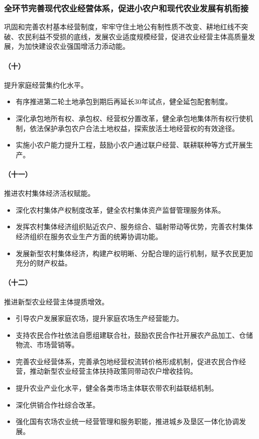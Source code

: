\subsubsection{全环节完善现代农业经营体系，促进小农户和现代农业发展有机衔接}

巩固和完善农村基本经营制度，牢牢守住土地公有制性质不改变、耕地红线不突破、农民利益不受损的底线，发展农业适度规模经营，促进农业经营主体高质量发展，为加快建设农业强国增活力添动能。

\paragraph{（十）}提升家庭经营集约化水平。

\begin{itemize}
    \item 有序推进第二轮土地承包到期后再延长30年试点，健全延包配套制度。
    \item 深化承包地所有权、承包权、经营权分置改革，健全承包地集体所有权行使机制，依法保护承包农户合法土地权益，探索放活土地经营权的有效途径。
    \item 实施小农户能力提升工程，鼓励小农户通过联户经营、联耕联种等方式开展生产。
\end{itemize}

\paragraph{（十一）}推进农村集体经济活权赋能。

\begin{itemize}
    \item 深化农村集体产权制度改革，健全农村集体资产监督管理服务体系。
    \item 发挥农村集体经济组织贴近农户、服务综合、辐射带动等优势，完善农村集体经济组织在服务农业生产方面的统筹协调功能。
    \item 发展新型农村集体经济，构建产权明晰、分配合理的运行机制，赋予农民更加充分的财产权益。
\end{itemize}

\paragraph{（十二）}推进新型农业经营主体提质增效。

\begin{itemize}
    \item 引导农户发展家庭农场，提升家庭农场生产经营能力。
    \item 支持农民合作社依法自愿组建联合社，鼓励农民合作社开展农产品加工、仓储物流、市场营销等。
    \item 完善农业经营体系，完善承包地经营权流转价格形成机制，促进农民合作经营，推动新型农业经营主体扶持政策同带动农户增收挂钩。
    \item 提升农业产业化水平，健全各类市场主体联农带农利益联结机制。
    \item 深化供销合作社综合改革。
    \item 强化国有农场农业统一经营管理和服务职能，推进城乡及垦区一体化协调发展。
\end{itemize}

